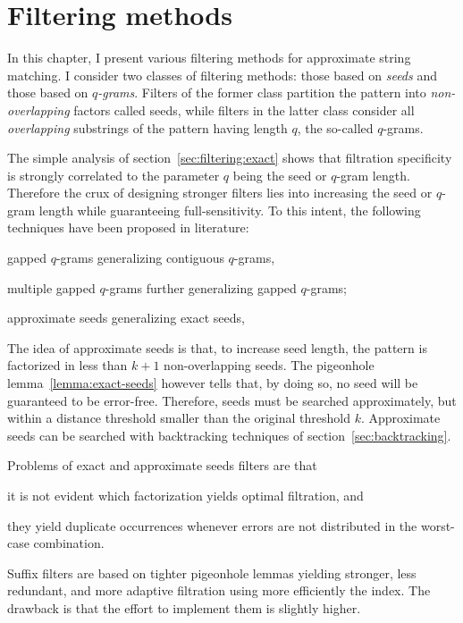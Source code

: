 \chapter{Filtering methods}

In this chapter, I present various filtering methods for approximate string matching.
I consider two classes of filtering methods: those based on \emph{seeds} and those based on \emph{$q$-grams}.
Filters of the former class partition the pattern into \emph{non-overlapping} factors called seeds, while filters in the latter class consider all \emph{overlapping} substrings of the pattern having length $q$, the so-called $q$-grams.

The simple analysis of section~\ref{sec:filtering:exact} shows that filtration specificity is strongly correlated to the parameter $q$ being the seed or $q$-gram length.
Therefore the crux of designing stronger filters lies into increasing the seed or $q$-gram length while guaranteeing full-sensitivity.
To this intent, the following techniques have been proposed in literature:
\begin{inparaenum}[(i)]
\item gapped $q$-grams generalizing contiguous $q$-grams,
\item multiple gapped $q$-grams further generalizing gapped $q$-grams;
\item approximate seeds generalizing exact seeds,
\end{inparaenum}

The idea of approximate seeds is that, to increase seed length, the pattern is factorized in less than $k+1$ non-overlapping seeds.
The pigeonhole lemma~\ref{lemma:exact-seeds} however tells that, by doing so, no seed will be guaranteed to be error-free.
Therefore, seeds must be searched approximately, but within a distance threshold smaller than the original threshold $k$.
Approximate seeds can be searched with backtracking techniques of section~\ref{sec:backtracking}.

Problems of exact and approximate seeds filters are that
\begin{inparaenum}[(i)]
\item it is not evident which factorization yields optimal filtration, and
\item they yield duplicate occurrences whenever errors are not distributed in the worst-case combination.
\end{inparaenum}
Suffix filters are based on tighter pigeonhole lemmas yielding stronger, less redundant, and more adaptive filtration using more efficiently the index.
The drawback is that the effort to implement them is slightly higher.


